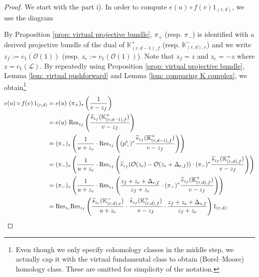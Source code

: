 \documentclass[10pt]{amsart}
\newcommand{\BK}{\mathbb{K}}
\newcommand{\CO}{\mathcal{O}}
\newcommand{\CL}{\mathcal{L}}
\newcommand{\Quot}{\textnormal{Quot}}
\newcommand{\+}{{}^+}
\newcommand{\Res}{\textnormal{Res}}
\theoremstyle{definition}
\theoremstyle {definition}
\theoremstyle {definition}
\begin{document}
\begin{proof}
We start with the part i). In order to compute $e(u)\circ f(v)1_{(r,d)}$, we use the diagram
\begin{center}
\end{center}
By Proposition \ref{prop: virtual projective bundle}, $\pi_+$ (resp. $\pi_-$) is identified with a derived projective bundle of the dual of $\BK^{+}_{(r,d-1), f}$ (resp. $\BK^-_{(r,d),e}$) and we write $z_f:=c_1(\CO(1))$ (resp. $z_e:=c_1(\CO(1))$). Note that $z_f=z$ and $z_e=-z$ where $z=c_1(\CL)$. By repeatedly using Proposition \ref{prop: virtual projective bundle}, Lemma \ref{lem: virtual pushforward} and Lemma \ref{lem: comparing K complex}, we obtain\footnote{Even though we only specify cohomology classes in the middle step, we actually cap it with the virtual fundamental class to obtain (Borel--Moore) homology class. These are omitted for simplicity of the notation.} 
\begin{align*}
    e(u)\circ f(v)\, 1_{(r,d)}
    &=e(u)\ (\pi_+)_*\left(\frac{1}{v-z_f}
    \right)\\
    &=e(u)\ \Res_{z_f}\left(\frac{\widehat s_{z_f}(\BK^+_{(r,d-1),f})}{v-z_f}
    \right)\\
    &=(\pi_-)_*\left(\frac{1}{u+z_e}\cdot 
    \Res_{z_f}\left((p_-^e)^*\frac{\widehat s_{z_f}(\BK^+_{(r,d-1),f})}{v-z_f}\right)
    \right)\\
    &=(\pi_-)_*\left(\frac{1}{u+z_e}\cdot 
    \Res_{z_f}\left(\widehat s_{z_f}(\CO(z_e)-\CO(z_e+\Delta_{e,f}))\cdot (\pi_-)^*\frac{\widehat s_{z_f}(\BK^+_{(r,d),f})}{v-z_f}\right)
    \right)\\
    &=(\pi_-)_*\left(\frac{1}{u+z_e}\cdot 
    \Res_{z_f}\left(\frac{z_f+z_e+\Delta_{e,f}}{z_f+z_e}\cdot (\pi_-)^*\frac{\widehat s_{z_f}(\BK^+_{(r,d),f})}{v-z_f}\right)
    \right)\\
    &=\Res_{z_e}\Res_{z_f}\left(
    \frac{\widehat s_{z_e}(\BK^-_{(r,d),e})}{u+z_e}\cdot \frac{\widehat s_{z_f}(\BK^+_{(r,d),f})}{v-z_f}\cdot \frac{z_f+z_e+\Delta_{e,f}}{z_f+z_e}
    \right)1_{(r,d)}.
\end{align*}

\end{proof}
\end{document}
